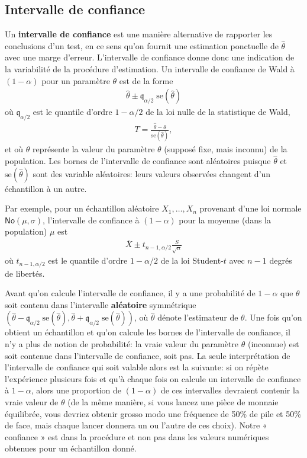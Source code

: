 \documentclass[
  11pt,
  letterpaper,
]{book}
\theoremstyle{definition}
\theoremstyle{definition}
\theoremstyle{definition}
\theoremstyle{remark}
\begin{document}
\hypertarget{intervalle-de-confiance}{%
\subsection{Intervalle de confiance}\label{intervalle-de-confiance}}

Un \textbf{intervalle de confiance} est une manière alternative de rapporter les conclusions d'un test, en ce sens qu'on fournit une estimation ponctuelle de \(\hat{\theta}\) avec une marge d'erreur. L'intervalle de confiance donne donc une indication de la variabilité de la procédure d'estimation. Un intervalle de confiance de Wald à \((1-\alpha)\) pour un paramètre \(\theta\) est de la forme
\begin{align*}
\widehat{\theta} \pm \mathfrak{q}_{\alpha/2} \; \mathrm{se}(\widehat{\theta})
\end{align*}
où \(\mathfrak{q}_{\alpha/2}\) est le quantile d'ordre \(1-\alpha/2\) de la loi nulle de la statistique de Wald,
\begin{align*}
T =\frac{\widehat{\theta}-\theta}{\mathrm{se}(\widehat{\theta})},
\end{align*}
et où \(\theta\) représente la valeur du paramètre \(\theta\) (supposé fixe, mais inconnu) de la population. Les bornes de l'intervalle de confiance sont aléatoires puisque \(\widehat{\theta}\) et \(\mathrm{se}(\widehat{\theta})\) sont des variable aléatoires: leurs valeurs observées changent d'un échantillon à un autre.

Par exemple, pour un échantillon aléatoire \(X_1, \ldots, X_n\) provenant d'une loi normale \(\mathsf{No}(\mu, \sigma)\), l'intervalle de confiance à \((1-\alpha)\) pour la moyenne (dans la population) \(\mu\) est
\begin{align*}
\overline{X} \pm t_{n-1, \alpha/2} \frac{S}{\sqrt{n}}
\end{align*}
où \(t_{n-1, \alpha/2}\) est le quantile d'ordre \(1-\alpha/2\) de la loi Student-\(t\) avec \(n-1\) degrés de libertés.

Avant qu'on calcule l'intervalle de confiance, il y a une probabilité de \(1-\alpha\) que \(\theta\) soit contenu dans l'intervalle \textbf{aléatoire} symmétrique \((\widehat{\theta} - \mathfrak{q}_{\alpha/2} \; \mathrm{se}(\widehat{\theta}), \widehat{\theta} + \mathfrak{q}_{\alpha/2} \; \mathrm{se}(\widehat{\theta}))\), où \(\widehat{\theta}\) dénote l'estimateur de \(\theta\). Une fois qu'on obtient un échantillon et qu'on calcule les bornes de l'intervalle de confiance, il n'y a plus de notion de probabilité: la vraie valeur du paramètre \(\theta\) (inconnue) est soit contenue dans l'intervalle de confiance, soit pas. La seule interprétation de l'intervalle de confiance qui soit valable alors est la suivante: si on répète l'expérience plusieurs fois et qu'à chaque fois on calcule un intervalle de confiance à \(1-\alpha\), alors une proportion de \((1-\alpha)\) de ces intervalles devraient contenir la vraie valeur de \(\theta\) (de la même manière, si vous lancez une pièce de monnaie équilibrée, vous devriez obtenir grosso modo une fréquence de 50\% de pile et 50\% de face, mais chaque lancer donnera un ou l'autre de ces choix). Notre « confiance » est dans la procédure et non pas dans les valeurs numériques obtenues pour un échantillon donné.
\end{document}
